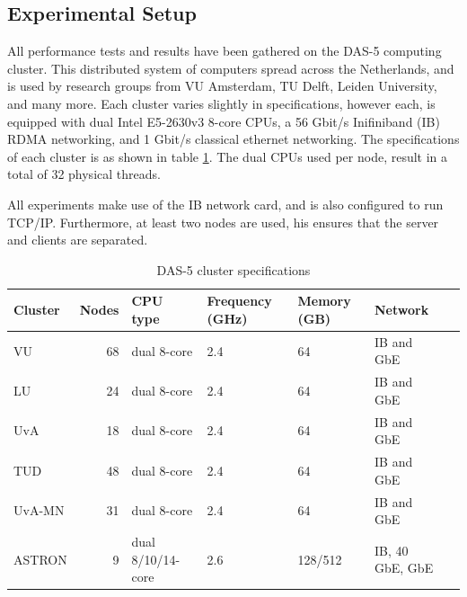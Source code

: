 \subsection{Experimental Setup}\label{subsec:experimental-setup}
All performance tests and results have been gathered on the DAS-5 computing cluster\cite{das5}.
This distributed system of computers spread across the Netherlands, and is used by research groups from VU Amsterdam, TU Delft, Leiden University, and many more.
Each cluster varies slightly in specifications, however each, is equipped with dual Intel E5-2630v3 8-core CPUs, a 56 Gbit/s Inifiniband (IB) RDMA networking, and 1 Gbit/s classical ethernet networking.
The specifications of each cluster is as shown in table \ref{tab:das5}.
The dual CPUs used per node, result in a total of 32 physical threads.

All experiments make use of the IB network card, and is also configured to run TCP/IP.
Furthermore, at least two nodes are used, his ensures that the server and clients are separated.

\begin{table}
    \centering
    \begin{tabular}{lrlllll}
        \toprule
        \textbf{Cluster} & \textbf{Nodes} & \textbf{CPU type} & \textbf{Frequency (GHz)} & \textbf{Memory (GB)} & \textbf{Network} \\
        \midrule
        VU & 68 & dual 8-core & 2.4 & 64 & IB and GbE \\
        LU & 24 & dual 8-core & 2.4 & 64 & IB and GbE \\
        UvA & 18 & dual 8-core & 2.4 & 64 & IB and GbE \\
        TUD & 48 & dual 8-core & 2.4 & 64 & IB and GbE \\
        UvA-MN & 31 & dual 8-core & 2.4 & 64 & IB and GbE \\
        ASTRON & 9 & dual 8/10/14-core & 2.6 & 128/512 & IB, 40 GbE, GbE \\
        \bottomrule
    \end{tabular}
    \caption{DAS-5 cluster specifications}
    \label{tab:das5}
\end{table}






